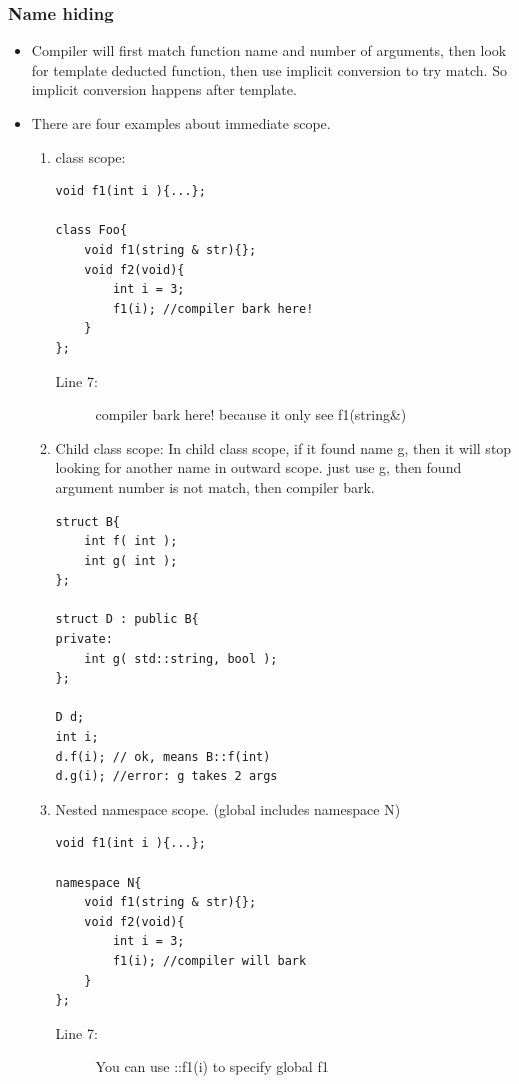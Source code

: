 \documentclass[a4paper,11pt,twoside]{book}
\begin{document}
\subsubsection{Name hiding}
\begin{itemize}
	
	\item Compiler will first match function name and number of arguments, then look for template deducted function, then use implicit conversion to try match. So implicit conversion happens after template.
	
	\item There are four examples about immediate scope.
	\begin{enumerate}
		\item class scope:
\begin{lstlisting}[numbers=none]
void f1(int i ){...};

class Foo{
	void f1(string & str){};
	void f2(void){
		int i = 3;
		f1(i); //compiler bark here!
	}
};
\end{lstlisting}
\begin{description}
	\item[Line 7:] compiler bark here! because it only see f1(string\&)
\end{description}
		
		\item Child class scope: In child class scope, if it found name g, then it will stop looking for another name in outward scope. just use g, then found argument number is not match, then compiler bark.
\begin{lstlisting}[numbers=none]
struct B{
	int f( int );
	int g( int );
};
		
struct D : public B{
private:
	int g( std::string, bool );
};
		
D d;
int i;
d.f(i); // ok, means B::f(int)
d.g(i); //error: g takes 2 args
\end{lstlisting}
		
\item Nested namespace scope. (global includes namespace N)
\begin{lstlisting}
void f1(int i ){...};

namespace N{
	void f1(string & str){};
	void f2(void){
		int i = 3;
		f1(i); //compiler will bark
	}
};
\end{lstlisting}
\begin{description}
	\item[Line 7:] You can use ::f1(i) to specify global f1
\end{description}


\end{enumerate}
\end{itemize}
\end{document}
